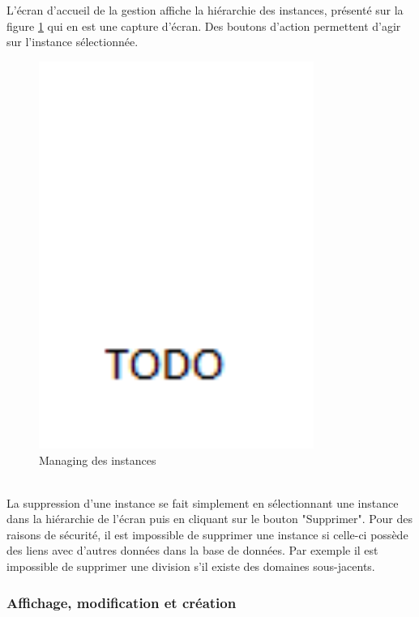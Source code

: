 L'écran d'accueil de la gestion affiche la hiérarchie des instances, présenté sur la figure \ref{instances_managing} qui en est une capture d'écran.
Des boutons d'action permettent d'agir sur l'instance sélectionnée.
\begin{figure}[!h]
	\center
	\includegraphics[width=0.8\textwidth]{img/instances_managing.png}
	\caption{Managing des instances}
	\label{instances_managing}
\end{figure}
~~\\

La suppression d'une instance se fait simplement en sélectionnant une instance dans la hiérarchie de l'écran puis en cliquant sur le bouton "Supprimer".
Pour des raisons de sécurité, il est impossible de supprimer une instance si celle-ci possède des liens avec d'autres données dans la base de données.
Par exemple il est impossible de supprimer une division s'il existe des domaines sous-jacents.


\subsubsection{Affichage, modification et création}

